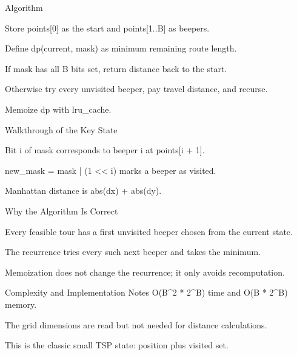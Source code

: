 \documentclass[aspectratio=169,11pt]{beamer}
\begin{document}
\begin{frame}{Algorithm}
\begin{tightitemize}
  \item Store points[0] as the start and points[1..B] as beepers.
  \item Define dp(current, mask) as minimum remaining route length.
  \item If mask has all B bits set, return distance back to the start.
  \item Otherwise try every unvisited beeper, pay travel distance, and recurse.
  \item Memoize dp with lru\_cache.
\end{tightitemize}
\end{frame}

\begin{frame}{Walkthrough of the Key State}
\begin{tightitemize}
  \item Bit i of mask corresponds to beeper i at points[i + 1].
  \item new\_mask = mask | (1 << i) marks a beeper as visited.
  \item Manhattan distance is abs(dx) + abs(dy).
\end{tightitemize}
\end{frame}

\begin{frame}{Why the Algorithm Is Correct}
\begin{tightitemize}
  \item Every feasible tour has a first unvisited beeper chosen from the current state.
  \item The recurrence tries every such next beeper and takes the minimum.
  \item Memoization does not change the recurrence; it only avoids recomputation.
\end{tightitemize}
\end{frame}

\begin{frame}{Complexity and Implementation Notes}
\small
{} O(B\textasciicircum{}2 * 2\textasciicircum{}B) time and O(B * 2\textasciicircum{}B) memory.

\vspace{0.3cm}
\begin{tightitemize}
  \item The grid dimensions are read but not needed for distance calculations.
  \item This is the classic small TSP state: position plus visited set.
\end{tightitemize}
\end{frame}
\end{document}
